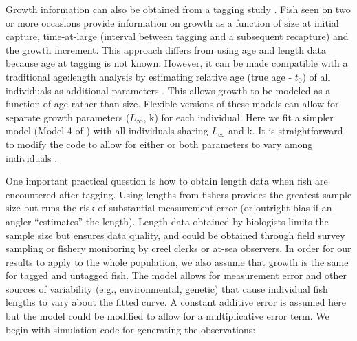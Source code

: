 \documentclass[
]{krantz}
\begin{document}
Growth information can also be obtained from a tagging study \citep{wang.etal1995, zhang.etal2009, scherrer.etal2021}. Fish seen on two or more occasions provide information on growth as a function of size at initial capture, time-at-large (interval between tagging and a subsequent recapture) and the growth increment. This approach differs from using age and length data because age at tagging is not known. However, it can be made compatible with a traditional age:length analysis by estimating relative age (true age - \(t_0\)) of all individuals as additional parameters \citep{wang.etal1995, zhang.etal2009, scherrer.etal2021}. This allows growth to be modeled as a function of age rather than size. Flexible versions of these models can allow for separate growth parameters (\(L_\infty\), k) for each individual. Here we fit a simpler model (Model 4 of \citet{scherrer.etal2021}) with all individuals sharing \(L_\infty\) and k. It is straightforward to modify the code to allow for either or both parameters to vary among individuals \citep{scherrer.etal2021}.

One important practical question is how to obtain length data when fish are encountered after tagging. Using lengths from fishers provides the greatest sample size but runs the risk of substantial measurement error (or outright bias if an angler ``estimates'' the length). Length data obtained by biologists limits the sample size but ensures data quality, and could be obtained through field survey sampling or fishery monitoring by creel clerks or at-sea observers. In order for our results to apply to the whole population, we also assume that growth is the same for tagged and untagged fish. The model allows for measurement error and other sources of variability (e.g., environmental, genetic) that cause individual fish lengths to vary about the fitted curve. A constant additive error is assumed here but the model could be modified to allow for a multiplicative error term. We begin with simulation code for generating the observations:
\end{document}
